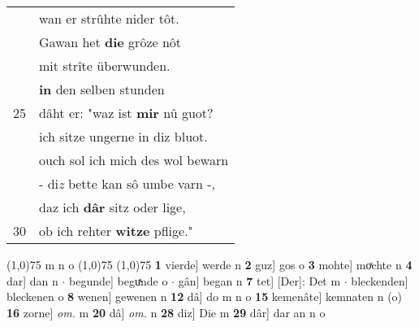 \documentclass[8pt,a4paper,notitlepage]{article}
\begin{document}
\begin{table}[ht]
\begin{minipage}[t]{0.5\linewidth}
\begin{tabular}{rl}
 & wan er strûhte nider tôt.\\ 
 & Gawan het \textbf{die} grôze nôt\\ 
 & mit strîte überwunden.\\ 
 & \textbf{in} den selben stunden\\ 
25 & dâht er: "waz ist \textbf{mir} nû guot?\\ 
 & ich sitze ungerne in diz bluot.\\ 
 & ouch sol ich mich des wol bewarn\\ 
 & - di\textit{z} bette kan sô umbe varn -,\\ 
 & daz ich \textbf{dâr} sitz oder lige,\\ 
30 & ob ich rehter \textbf{witze} pflige."\\ 
\end{tabular}
\scriptsize
\line(1,0){75} \newline
m n o \newline
\line(1,0){75} \newline
\newline
\line(1,0){75} \newline
\textbf{1} vierde] werde n \textbf{2} guz] gos o \textbf{3} mohte] moͯchte n \textbf{4} dar] dan n  $\cdot$ begunde] beguͯnde o  $\cdot$ gân] began n \textbf{7} tet] [Der]: Det m  $\cdot$ bleckenden] bleckenen o \textbf{8} wenen] gewenen n \textbf{12} dâ] do m n o \textbf{15} kemenâte] kemnaten n (o) \textbf{16} zorne] \textit{om.} m \textbf{20} dâ] \textit{om.} n \textbf{28} diz] Die m \textbf{29} dâr] dar an n o \newline
\end{minipage}
\end{table}
\newpage
\end{document}
